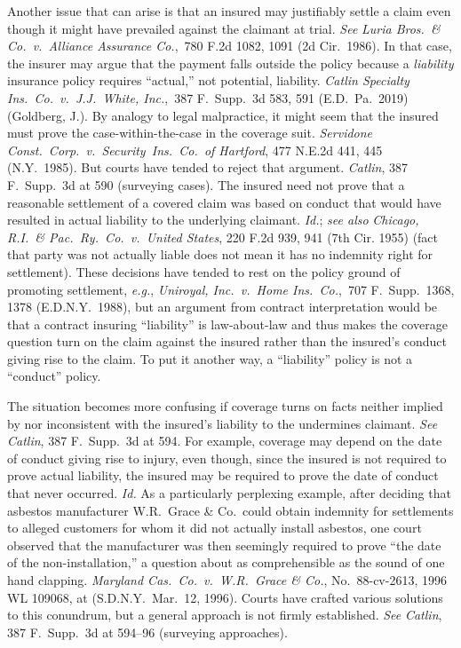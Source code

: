 \documentclass[
  12pt,
  letterpaper,
]{scrartcl}
\begin{document}
Another issue that can arise is that an insured may justifiably settle a claim
even though it might have prevailed against the claimant at trial. \textit{See}
\textit{Luria Bros.~\& Co.~v.~Alliance Assurance Co.},~780 F.2d 1082, 1091 (2d
Cir.~1986). In that case, the insurer may argue that the payment falls outside
the policy because a \emph{liability} insurance policy requires ``actual,'' not
potential, liability. \textit{Catlin Specialty Ins.~Co.~v.~J.J.~White,
Inc.},~387 F.~Supp.~3d 583, 591 (E.D.~Pa.~2019) (Goldberg, J.). By analogy to
legal malpractice, it might seem that the insured must prove the
case-within-the-case in the coverage suit. \textit{Servidone
Const.~Corp.~v.~Security~Ins.~Co.~of Hartford}, 477 N.E.2d 441, 445
(N.Y.~1985). But courts have tended to reject that argument. \textit{Catlin},
387 F.~Supp.~3d at 590 (surveying cases). The insured need not prove that a
reasonable settlement of a covered claim was based on conduct that would have
resulted in actual liability to the underlying claimant. \textit{Id.};
\textit{see also} \textit{Chicago, R.I.~\& Pac.~Ry.~Co.~v.~United States}, 220
F.2d 939, 941 (7th Cir. 1955) (fact that party was not actually liable does not
mean it has no indemnity right for settlement). These decisions have tended to
rest on the policy ground of promoting settlement, \textit{e.g.},
\textit{Uniroyal, Inc.~v.~Home Ins.~Co.},~707 F.~Supp.~1368, 1378
(E.D.N.Y.~1988), but an argument from contract interpretation would be that a
contract insuring ``liability'' is law-about-law and thus makes the coverage
question turn on the claim against the insured rather than the insured's
conduct giving rise to the claim. To put it another way, a ``liability'' policy
is not a ``conduct'' policy.

The situation becomes more confusing if coverage turns on facts neither implied
by nor inconsistent with the insured's liability to the undermines claimant.
\textit{See} \textit{Catlin}, 387 F.~Supp.~3d at 594. For example, coverage may
depend on the date of conduct giving rise to injury, even though, since the
insured is not required to prove actual liability, the insured may be required
to prove the date of conduct that never occurred. \textit{Id.} As a
particularly perplexing example, after deciding that asbestos manufacturer
W.R.~Grace \& Co.~could obtain indemnity for settlements to alleged customers
for whom it did not actually install asbestos, one court observed that the
manufacturer was then seemingly required to prove ``the date of the
non-installation,'' a question about as comprehensible as the sound of one hand
clapping. \textit{Maryland Cas.~Co.~v.~W.R.~Grace \& Co.}, No.~88-cv-2613, 1996
WL 109068, at  (S.D.N.Y.~Mar.~12, 1996). Courts have crafted various
solutions to this conundrum, but a general approach is not firmly established.
\textit{See} \textit{Catlin}, 387 F.~Supp.~3d at 594--96 (surveying
approaches).
\end{document}
